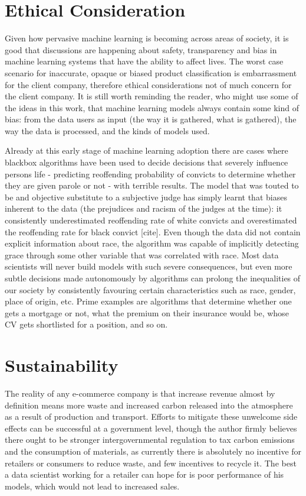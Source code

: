 \section{Ethical Consideration}

Given how pervasive  machine learning is becoming across areas of society, it is good that discussions are happening about safety, transparency and bias in machine learning systems that have the ability to affect lives.
The worst case scenario for inaccurate,  opaque or biased product classification  is embarrassment for the client company,  therefore ethical considerations not of much concern for the client company.
It is still worth reminding the reader, who might use some of the ideas in this work,  that machine learning  models always contain some kind of bias:  from the data users as input (the way it is gathered, what is gathered),  the way the data is processed, and the kinds of models used.

Already at this early stage of machine learning adoption there are cases where blackbox algorithms have been used to decide decisions that severely influence persons life -  predicting reoffending probability  of convicts to determine  whether they are given parole or not - with terrible results.
The model that was touted to be and objective substitute to a subjective judge has simply learnt that biases inherent to the data (the prejudices and racism of  the judges at the time):  it consistently underestimated reoffending rate of white convicts and overestimated the reoffending rate for black convict [cite].
Even though the data did not contain explicit information about race, the algorithm  was capable of implicitly detecting grace through some other variable that was correlated with race.
Most data scientists will never build models with such severe consequences, but even more subtle decisions  made autonomously by algorithms  can prolong the  inequalities of our society by consistently favouring certain  characteristics such as race, gender, place of origin, etc.
Prime examples are algorithms that determine whether one gets a mortgage or not, what the premium on their insurance would be, whose CV gets shortlisted for a position, and so on.

\section{Sustainability}

The reality of any e-commerce company is that increase revenue almost by definition means more waste  and increased carbon released into the atmosphere  as a result of production and transport.
Efforts to mitigate these unwelcome side effects can be successful at a government level, though  the author firmly believes there ought to be stronger intergovernmental regulation to tax carbon emissions and the consumption of materials, as currently there is absolutely no incentive for retailers or consumers to reduce waste, and few incentives to recycle it.
The best a data scientist working for a retailer can hope for is poor performance of his models, which would not lead to increased sales.

